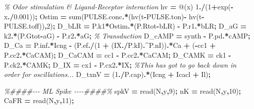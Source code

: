 \documentclass[
]{article}
\newenvironment{Shaded}{\begin{snugshade}}{\end{snugshade}}
\newcommand{\CommentTok}[1]{\textcolor[rgb]{0.56,0.35,0.01}{\textit{#1}}}
\newcommand{\FloatTok}[1]{\textcolor[rgb]{0.00,0.00,0.81}{#1}}
\newcommand{\FunctionTok}[1]{\textcolor[rgb]{0.00,0.00,0.00}{#1}}
\newcommand{\NormalTok}[1]{#1}
\newcommand{\OperatorTok}[1]{\textcolor[rgb]{0.81,0.36,0.00}{\textbf{#1}}}
\begin{document}
\begin{Shaded}
\begin{Highlighting}[]
        \CommentTok{\% Odor stimulation \& Ligand{-}Receptor interaction }
\NormalTok{        hv }\OperatorTok{=}\NormalTok{ @(x) }\FloatTok{1}\OperatorTok{./}\NormalTok{(}\FloatTok{1}\OperatorTok{+}\FunctionTok{exp}\NormalTok{(}\OperatorTok{{-}}\NormalTok{x}\OperatorTok{./}\FloatTok{0.001}\NormalTok{))}\OperatorTok{;}
\NormalTok{        Ostim }\OperatorTok{=} \FunctionTok{sum}\NormalTok{(PULSE.conc}\OperatorTok{.*}\NormalTok{(hv(t}\OperatorTok{{-}}\NormalTok{PULSE.ton)}\OperatorTok{{-}}\NormalTok{ hv(t}\OperatorTok{{-}}\NormalTok{PULSE.toff))}\OperatorTok{,}\FloatTok{2}\NormalTok{)}\OperatorTok{;}        
\NormalTok{        D\_bLR }\OperatorTok{=}\NormalTok{ P.k1}\OperatorTok{*}\NormalTok{Ostim}\OperatorTok{.*}\NormalTok{(P.Rtot}\OperatorTok{{-}}\NormalTok{bLR) }\OperatorTok{{-}}\NormalTok{ P.r1}\OperatorTok{.*}\NormalTok{bLR}\OperatorTok{;}
\NormalTok{        D\_aG }\OperatorTok{=}\NormalTok{ k2}\OperatorTok{.*}\NormalTok{(P.Gtot}\OperatorTok{{-}}\NormalTok{aG) }\OperatorTok{{-}}\NormalTok{ P.r2}\OperatorTok{.*}\NormalTok{aG}\OperatorTok{;}
        \CommentTok{\% Transduction}
\NormalTok{        D\_cAMP }\OperatorTok{=}\NormalTok{ synth }\OperatorTok{{-}}\NormalTok{ P.pd}\OperatorTok{.*}\NormalTok{cAMP}\OperatorTok{;}
\NormalTok{        D\_Ca }\OperatorTok{=}\NormalTok{ P.inf}\OperatorTok{.*}\NormalTok{Icng }\OperatorTok{{-}}\NormalTok{ (P.ef}\OperatorTok{./}\NormalTok{(}\FloatTok{1} \OperatorTok{+}\NormalTok{ (IX}\OperatorTok{./}\NormalTok{P.kI)}\OperatorTok{.\^{}}\NormalTok{P.nI))}\OperatorTok{.*}\NormalTok{Ca }\OperatorTok{+}\NormalTok{ (}\OperatorTok{{-}}\NormalTok{cc1 }\OperatorTok{+}\NormalTok{ P.cc2}\OperatorTok{.*}\NormalTok{CaCAM)}\OperatorTok{;}
\NormalTok{        D\_CaCAM }\OperatorTok{=}\NormalTok{ cc1 }\OperatorTok{{-}}\NormalTok{ P.cc2}\OperatorTok{.*}\NormalTok{CaCAM}\OperatorTok{;}
\NormalTok{        D\_CAMK }\OperatorTok{=}\NormalTok{ ck1 }\OperatorTok{{-}}\NormalTok{ P.ck2}\OperatorTok{.*}\NormalTok{CAMK}\OperatorTok{;}
\NormalTok{        D\_IX }\OperatorTok{=}\NormalTok{ cx1 }\OperatorTok{{-}}\NormalTok{ P.cx2}\OperatorTok{.*}\NormalTok{IX}\OperatorTok{;}  \CommentTok{\%This has got to go back down in order for oscillations...}
\NormalTok{        D\_txnV }\OperatorTok{=}\NormalTok{ (}\FloatTok{1}\OperatorTok{./}\NormalTok{P.cap)}\OperatorTok{.*}\NormalTok{(Icng }\OperatorTok{+}\NormalTok{ Icacl }\OperatorTok{+}\NormalTok{ Il)}\OperatorTok{;}
        
        \CommentTok{\%\#\#\#\#{-}{-}{-} ML Spike {-}{-}{-}{-}\#\#\#\#\%}
\NormalTok{        spkV    }\OperatorTok{=}\NormalTok{ read(N}\OperatorTok{,}\NormalTok{y}\OperatorTok{,}\FloatTok{9}\NormalTok{)}\OperatorTok{;}
\NormalTok{        nK      }\OperatorTok{=}\NormalTok{ read(N}\OperatorTok{,}\NormalTok{y}\OperatorTok{,}\FloatTok{10}\NormalTok{)}\OperatorTok{;}
\NormalTok{        CaFR    }\OperatorTok{=}\NormalTok{ read(N}\OperatorTok{,}\NormalTok{y}\OperatorTok{,}\FloatTok{11}\NormalTok{)}\OperatorTok{;}


\end{Highlighting}
\end{Shaded}
\end{document}
